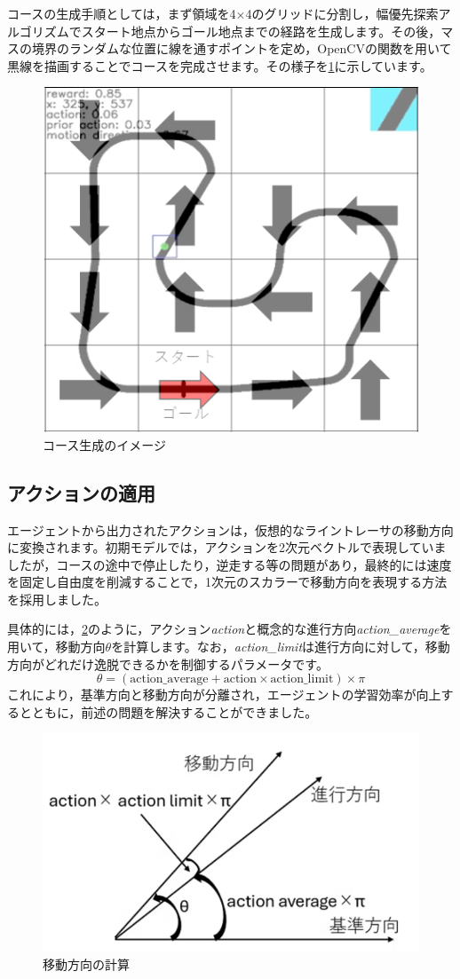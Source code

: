 \documentclass{jsbook}
\numberwithin{equation}{section}
\begin{document}
コースの生成手順としては，まず領域を4×4のグリッドに分割し，幅優先探索アルゴリズムでスタート地点からゴール地点までの経路を生成します。その後，マスの境界のランダムな位置に線を通すポイントを定め，OpenCVの関数を用いて黒線を描画することでコースを完成させます。その様子を\ref{fig:image3}に示しています。

\begin{figure}[h]
  \centering
  \includegraphics[width=0.7\hsize]{fig/image3.png}
  \caption{コース生成のイメージ}
  \label{fig:image3}
\end{figure}

\subsection{アクションの適用}
エージェントから出力されたアクションは，仮想的なライントレーサの移動方向に変換されます。初期モデルでは，アクションを2次元ベクトルで表現していましたが，コースの途中で停止したり，逆走する等の問題があり，最終的には速度を固定し自由度を削減することで，1次元のスカラーで移動方向を表現する方法を採用しました。

具体的には，\ref{fig:image4}のように，アクション\textit{action}と概念的な進行方向\textit{action\_average}を用いて，移動方向$\theta$を計算します。なお，\textit{action\_limit}は進行方向に対して，移動方向がどれだけ逸脱できるかを制御するパラメータです。
\[
\theta = (\text{action\_average} + \text{action} \times \text{action\_limit}) \times \pi
\]
これにより，基準方向と移動方向が分離され，エージェントの学習効率が向上するとともに，前述の問題を解決することができました。
\begin{figure}[h]
  \centering
  \includegraphics[width=0.7\hsize]{fig/image4.png}
  \caption{移動方向の計算}
  \label{fig:image4}
\end{figure}
\end{document}
